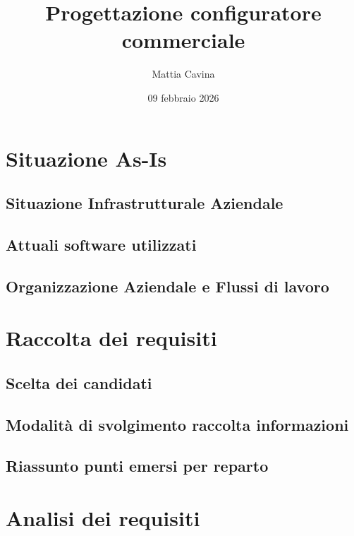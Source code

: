 \documentclass[12pt, a4paper]{article}
\title{Progettazione configuratore commerciale}
\author{Mattia Cavina}
\date{09 febbraio 2026}
\begin{document}
\maketitle
\newpage

\tableofcontents



% 
\section{Situazione As-Is}
\subsection{Situazione Infrastrutturale Aziendale}
\subsection{Attuali software utilizzati}
\subsection{Organizzazione Aziendale e Flussi di lavoro}

% 
\section{Raccolta dei requisiti}
\subsection{Scelta dei candidati}
\subsection{Modalità di svolgimento raccolta informazioni}
\subsection{Riassunto punti emersi per reparto}

%
\section{Analisi dei requisiti}
\end{document}
